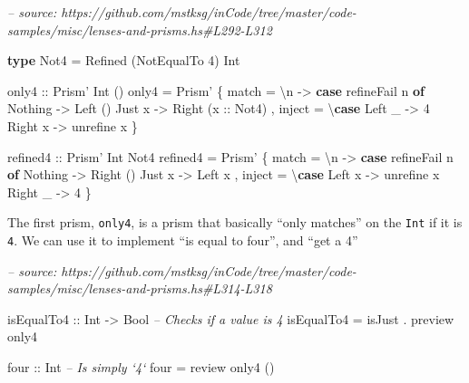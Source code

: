 \documentclass[]{article}
\newenvironment{Shaded}{}{}
\newcommand{\CommentTok}[1]{\textcolor[rgb]{0.38,0.63,0.69}{\textit{#1}}}
\newcommand{\DataTypeTok}[1]{\textcolor[rgb]{0.56,0.13,0.00}{#1}}
\newcommand{\DecValTok}[1]{\textcolor[rgb]{0.25,0.63,0.44}{#1}}
\newcommand{\FunctionTok}[1]{\textcolor[rgb]{0.02,0.16,0.49}{#1}}
\newcommand{\KeywordTok}[1]{\textcolor[rgb]{0.00,0.44,0.13}{\textbf{#1}}}
\newcommand{\NormalTok}[1]{#1}
\newcommand{\OtherTok}[1]{\textcolor[rgb]{0.00,0.44,0.13}{#1}}
\begin{document}
\begin{Shaded}
\begin{Highlighting}[]
\CommentTok{-- source: https://github.com/mstksg/inCode/tree/master/code-samples/misc/lenses-and-prisms.hs#L292-L312}

\KeywordTok{type} \DataTypeTok{Not4} \FunctionTok{=} \DataTypeTok{Refined}\NormalTok{ (}\DataTypeTok{NotEqualTo} \DecValTok{4}\NormalTok{) }\DataTypeTok{Int}

\OtherTok{only4 ::} \DataTypeTok{Prism'} \DataTypeTok{Int}\NormalTok{ ()}
\NormalTok{only4 }\FunctionTok{=} \DataTypeTok{Prism'}
\NormalTok{    \{ match  }\FunctionTok{=}\NormalTok{ \textbackslash{}n }\OtherTok{->} \KeywordTok{case}\NormalTok{ refineFail n }\KeywordTok{of}
        \DataTypeTok{Nothing} \OtherTok{->} \DataTypeTok{Left}\NormalTok{ ()}
        \DataTypeTok{Just}\NormalTok{ x  }\OtherTok{->} \DataTypeTok{Right}\NormalTok{ (}\OtherTok{x ::} \DataTypeTok{Not4}\NormalTok{)}
\NormalTok{    , inject }\FunctionTok{=}\NormalTok{ \textbackslash{}}\KeywordTok{case}
        \DataTypeTok{Left}\NormalTok{  _ }\OtherTok{->} \DecValTok{4}
        \DataTypeTok{Right}\NormalTok{ x }\OtherTok{->}\NormalTok{ unrefine x}
\NormalTok{    \}}

\OtherTok{refined4 ::} \DataTypeTok{Prism'} \DataTypeTok{Int} \DataTypeTok{Not4}
\NormalTok{refined4 }\FunctionTok{=} \DataTypeTok{Prism'}
\NormalTok{    \{ match  }\FunctionTok{=}\NormalTok{ \textbackslash{}n }\OtherTok{->} \KeywordTok{case}\NormalTok{ refineFail n }\KeywordTok{of}
        \DataTypeTok{Nothing} \OtherTok{->} \DataTypeTok{Right}\NormalTok{ ()}
        \DataTypeTok{Just}\NormalTok{ x  }\OtherTok{->} \DataTypeTok{Left}\NormalTok{ x}
\NormalTok{    , inject }\FunctionTok{=}\NormalTok{ \textbackslash{}}\KeywordTok{case}
        \DataTypeTok{Left}\NormalTok{  x }\OtherTok{->}\NormalTok{ unrefine x}
        \DataTypeTok{Right}\NormalTok{ _ }\OtherTok{->} \DecValTok{4}
\NormalTok{    \}}
\end{Highlighting}
\end{Shaded}

The first prism, \texttt{only4}, is a prism that basically ``only matches'' on
the \texttt{Int} if it is \texttt{4}. We can use it to implement ``is equal to
four'', and ``get a 4''

\begin{Shaded}
\begin{Highlighting}[]
\CommentTok{-- source: https://github.com/mstksg/inCode/tree/master/code-samples/misc/lenses-and-prisms.hs#L314-L318}

\OtherTok{isEqualTo4 ::} \DataTypeTok{Int} \OtherTok{->} \DataTypeTok{Bool}   \CommentTok{-- Checks if a value is 4}
\NormalTok{isEqualTo4 }\FunctionTok{=}\NormalTok{ isJust }\FunctionTok{.}\NormalTok{ preview only4}

\OtherTok{four ::} \DataTypeTok{Int}     \CommentTok{-- Is simply `4`}
\NormalTok{four }\FunctionTok{=}\NormalTok{ review only4 ()}
\end{Highlighting}
\end{Shaded}
\end{document}
